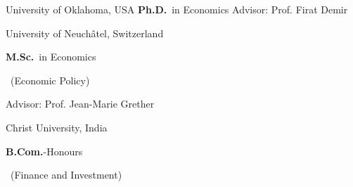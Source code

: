 	{%
		University of Oklahoma, USA}
	{%
		\textbf{Ph.D.}~in Economics}
	{%
	Advisor: Prof. Firat Demir}

		{%
			University of Neuch\^atel, Switzerland}
		{%
			\textbf{M.Sc.}~in Economics\begin{footnotesize}
				~(Economic Policy)
			\end{footnotesize}}
		{%
	Advisor: Prof. Jean-Marie Grether}

		{%
			Christ University, India}
		{%
			\textbf{B.Com.}-Honours\begin{footnotesize}
				~(Finance and Investment)
			\end{footnotesize}}
		{%
		}